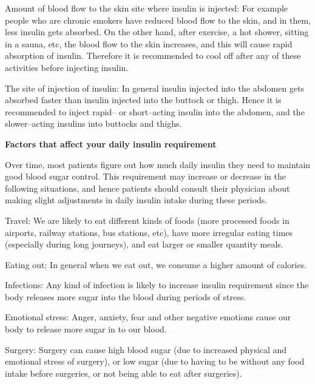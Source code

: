  \item Amount of blood flow to the skin site where insulin is injected: For example people who are chronic smokers have reduced blood flow to the skin, and in them, less insulin gets absorbed. On the other hand, after exercise, a hot shower, sitting in a sauna, etc, the blood flow to the skin increases, and this will cause rapid absorption of insulin. Therefore it is recommended to cool off after any of these activities before injecting insulin.

 \item The site of injection of insulin: In general insulin injected into the abdomen gets absorbed faster than insulin injected into the buttock or thigh. Hence it is recommended to inject rapid– or short–acting insulin into the abdomen, and the slower–acting insulins into buttocks and thighs.

\textbf{Factors that affect your daily insulin requirement}

Over time, most patients figure out how much daily insulin they need to maintain good blood sugar control. This requirement may increase or decrease in the following situations, and hence patients should consult their physician about making slight adjustments in daily insulin intake during these periods.

\item Travel: We are likely to eat different kinds of foods (more processed foods in airports, railway stations, bus stations, etc), have more irregular eating times (especially during long journeys), and eat larger or smaller quantity meals.

 \item Eating out: In general when we eat out, we consume a higher amount of calories.

 \item Infections: Any kind of infection is likely to increase insulin requirement since the body releases more sugar into the blood during periods of stress.

 \item Emotional stress: Anger, anxiety, fear and other negative emotions cause our body to release more sugar in to our blood.

 \item Surgery: Surgery can cause high blood sugar (due to increased physical and emotional stress of surgery), or low sugar (due to having to be without any food intake before surgeries, or not being able to eat after surgeries).

